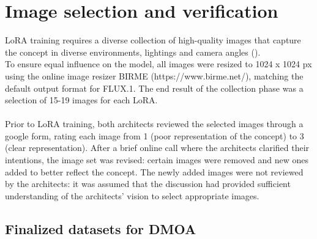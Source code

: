 \section{Image selection and verification} \label{sec:Finalized training datasets}
LoRA training requires a diverse collection of high-quality images that capture the concept in diverse environments, lightings and camera angles (\cite{deepfates_fine-tune_2024}).\\
To ensure equal influence on the model, all images were resized to 1024 x 1024 px using the online image resizer BIRME (https://www.birme.net/), matching the default output format for FLUX.1. The end result of the collection phase was a selection of 15-19 images for each LoRA.\\~\\
Prior to LoRA training, both architects reviewed the selected images through a google form, rating each image from 1 (poor representation of the concept) to 3 (clear representation). After a brief online call where the architects clarified their intentions, the image set was revised: certain images were removed and new ones added to better reflect the concept. The newly added images were not reviewed by the architects: it was assumed that the discussion had provided sufficient understanding of the architects' vision to select appropriate images.\\

\subsection{Finalized datasets for DMOA}
